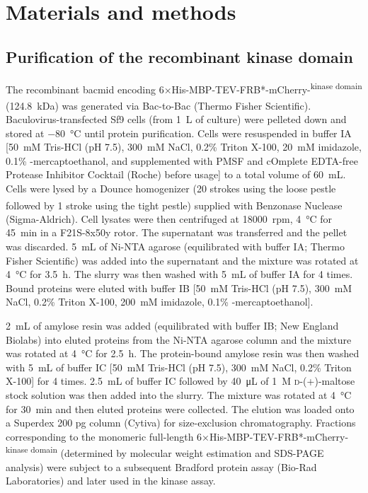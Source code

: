 \section{Materials and methods}

\subsection{Purification of the recombinant  kinase domain}
\label{RecombinantMPS1KDPurification}
The recombinant bacmid encoding 6×His-MBP-TEV-FRB*-mCherry-\textsuperscript{kinase domain} (\SI{124.8}{kDa}) was generated %
via Bac-to-Bac\textsuperscript{\textregistered} (Thermo Fisher Scientific). Baculovirus-transfected Sf9 cells (from \SI{1}{L} of culture) were pelleted down and stored at \SI{-80}{\celsius} until protein purification. Cells were resuspended in buffer IA [\SI{50}{mM} Tris-HCl (pH 7.5), \SI{300}{mM} NaCl, 0.2\% Triton X-100, \SI{20}{mM} imidazole, 0.1\% \textbeta-mercaptoethanol, and supplemented with PMSF and cOmplete\texttrademark{} EDTA-free Protease Inhibitor Cocktail (Roche) before usage] to a total volume of \SI{60}{mL}. Cells were lysed by a Dounce homogenizer (20 strokes using the loose pestle followed by 1 stroke using the tight pestle) supplied with Benzonase\textsuperscript{\textregistered} Nuclease (Sigma-Aldrich). Cell lysates were then centrifuged at \SI{18000}{rpm}, \SI{4}{\celsius} for \SI{45}{min} in a F21S-8x50y rotor. The supernatant was transferred and the pellet was discarded. \SI{5}{mL} of Ni-NTA agarose (equilibrated with buffer IA; Thermo Fisher Scientific) was added into the supernatant and the mixture was rotated at \SI{4}{\celsius} for \SI{3.5}{h}. The slurry was then washed with \SI{5}{mL} of buffer IA for 4 times. Bound proteins were eluted with buffer IB [\SI{50}{mM} Tris-HCl (pH 7.5), \SI{300}{mM} NaCl, 0.2\% Triton X-100, \SI{200}{mM} imidazole, 0.1\% \textbeta-mercaptoethanol].

\SI{2}{mL} of amylose resin was added (equilibrated with buffer IB; New England Biolabs) into eluted proteins from the Ni-NTA agarose column and the mixture was rotated at \SI{4}{\celsius} for \SI{2.5}{h}. The protein-bound amylose resin was then washed with \SI{5}{mL} of buffer IC [\SI{50}{mM} Tris-HCl (pH 7.5), \SI{300}{mM} NaCl, 0.2\% Triton X-100] for 4 times. \SI{2.5}{mL} of buffer IC followed by \SI{40}{\micro L} of \SI{1}{M} \textsc{d}-(+)-maltose stock solution was then added into the slurry. The mixture was rotated at \SI{4}{\celsius} for \SI{30}{min} and then eluted proteins were collected. The elution was loaded onto a Superdex 200 pg column (Cytiva) for size-exclusion chromatography. Fractions corresponding to the monomeric full-length 6×His-MBP-TEV-FRB*-mCherry-\textsuperscript{kinase domain} (determined by molecular weight estimation and SDS-PAGE analysis) were subject to a subsequent Bradford protein assay (Bio-Rad Laboratories) and later used in the  kinase assay.

